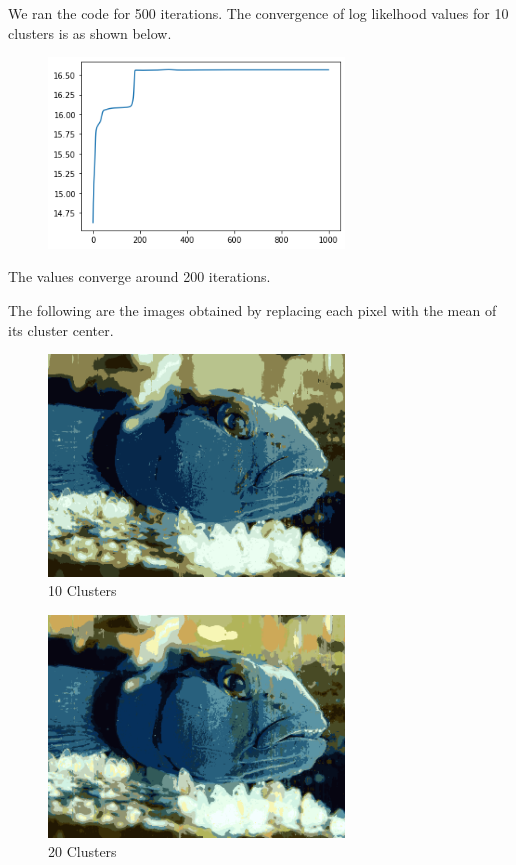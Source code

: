 \documentclass{article}      %
\begin{document}
We ran the code for 500 iterations. The convergence of log likelhood values for 10 clusters is as shown below. 

\begin{figure}[H]
\centering
\includegraphics[width=0.7\textwidth]{Convergence_partb_10}
\end{figure}

The values converge around 200 iterations.

The following are the images obtained by replacing each pixel with the mean of its cluster center. 

\begin{figure}[H]
\centering
\includegraphics[width=0.7\textwidth]{partc_10_means}
\caption{10 Clusters}
\end{figure}

\begin{figure}[H]
\centering
\includegraphics[width=0.7\textwidth]{partc_20_means}
\caption{20 Clusters}
\end{figure}
\end{document}
